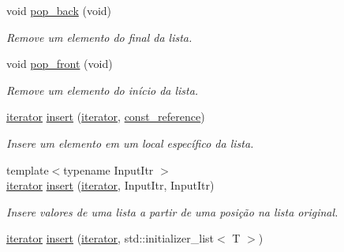 \begin{DoxyCompactItemize}
void \hyperlink{classsc_1_1vector_a14f1f81fdf7c217436a711fc146dd468}{pop\+\_\+back} (void)
\begin{DoxyCompactList}\small\item\em Remove um elemento do final da lista. \end{DoxyCompactList}\item 
\mbox{\label{classsc_1_1vector_a70a3d59cfa4558d7efbb42f8a8e772d7}} 
void \hyperlink{classsc_1_1vector_a70a3d59cfa4558d7efbb42f8a8e772d7}{pop\+\_\+front} (void)
\begin{DoxyCompactList}\small\item\em Remove um elemento do início da lista. \end{DoxyCompactList}\item 
\mbox{\label{classsc_1_1vector_a01e7462fc5e35d8e1081dfe3bf6b62ea}} 
\hyperlink{classsc_1_1vector_a9e5d5cc35e379aa27a93989f4a71413c}{iterator} \hyperlink{classsc_1_1vector_a01e7462fc5e35d8e1081dfe3bf6b62ea}{insert} (\hyperlink{classsc_1_1vector_a9e5d5cc35e379aa27a93989f4a71413c}{iterator}, \hyperlink{classsc_1_1vector_a8da2b1a11b069241100f9b2e14f481a0}{const\+\_\+reference})
\begin{DoxyCompactList}\small\item\em Insere um elemento em um local específico da lista. \end{DoxyCompactList}\item 
\mbox{\label{classsc_1_1vector_acf2e500da5525a7a0069e2947df98d43}} 
{\footnotesize template$<$typename Input\+Itr $>$ }\\\hyperlink{classsc_1_1vector_a9e5d5cc35e379aa27a93989f4a71413c}{iterator} \hyperlink{classsc_1_1vector_acf2e500da5525a7a0069e2947df98d43}{insert} (\hyperlink{classsc_1_1vector_a9e5d5cc35e379aa27a93989f4a71413c}{iterator}, Input\+Itr, Input\+Itr)
\begin{DoxyCompactList}\small\item\em Insere valores de uma lista a partir de uma posição na lista original. \end{DoxyCompactList}\item 
\mbox{\label{classsc_1_1vector_a038b7769a69eea810e6913fb910236d6}} 
\hyperlink{classsc_1_1vector_a9e5d5cc35e379aa27a93989f4a71413c}{iterator} \hyperlink{classsc_1_1vector_a038b7769a69eea810e6913fb910236d6}{insert} (\hyperlink{classsc_1_1vector_a9e5d5cc35e379aa27a93989f4a71413c}{iterator}, std\+::initializer\+\_\+list$<$ T $>$)

\end{DoxyCompactItemize}
